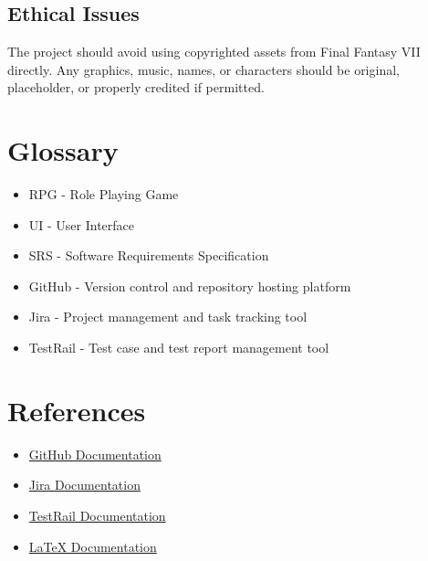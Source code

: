 \documentclass{article}
\begin{document}
\subsection{Ethical Issues}
The project should avoid using copyrighted assets from Final Fantasy VII directly. Any graphics, music, names, or characters should be original, placeholder, or properly credited if permitted.

\section{Glossary}

\begin{itemize}
    \item RPG - Role Playing Game
    \item UI - User Interface
    \item SRS - Software Requirements Specification
    \item GitHub - Version control and repository hosting platform
    \item Jira - Project management and task tracking tool
    \item TestRail - Test case and test report management tool
\end{itemize}

\section{References}

\begin{itemize}
    \item \href{https://docs.github.com/}{GitHub Documentation}
    \item \href{https://support.atlassian.com/jira-software-cloud/}{Jira Documentation}
    \item \href{https://support.testrail.com/}{TestRail Documentation}
    \item \href{https://www.latex-project.org/help/documentation/}{LaTeX Documentation}
\end{itemize}
\end{document}

